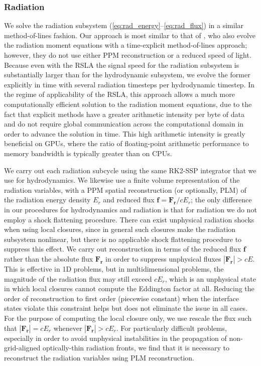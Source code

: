 \documentclass[fleqn,usenatbib]{mnras}
\begin{document}
\subsubsection{Radiation}
\label{sssec:radiation}

We solve the radiation subsystem (\autoref{eq:rad_energy}--\autoref{eq:rad_flux}) in a similar method-of-lines fashion. Our approach is most similar to that of \cite{Skinner_2019}, who also evolve the radiation moment equations with a time-explicit method-of-lines approach; however, they do not use either PPM reconstruction or a reduced speed of light. Because even with the RSLA the signal speed for the radiation subsystem is substantially larger than for the hydrodynamic subsystem, we evolve the former explicitly in time with several radiation timesteps per hydrodynamic timestep. In the regime of applicability of the RSLA, this approach allows a much more computationally efficient solution to the radiation moment equations, due to the fact that explicit methods have a greater arithmetic intensity per byte of data and do not require global communication across the computational domain in order to advance the solution in time. This high arithmetic intensity is greatly beneficial on GPUs, where the ratio of floating-point arithmetic performance to memory bandwidth is typically greater than on CPUs.

We carry out each radiation subcycle using the same RK2-SSP integrator \citep{Shu_1988} that we use for hydrodynamics. We likewise use a finite volume representation of the radiation variables, with a PPM spatial reconstruction (or optionally, PLM) of the radiation energy density $E_r$ and reduced flux $\mathbf{f} = \mathbf{F_r} / cE_r$; the only difference in our procedures for hydrodynamics and radiation is that for radiation we do not employ a shock flattening procedure. There can exist unphysical radiation shocks when using local closures, since in general such closures make the radiation subsystem nonlinear, but there is no applicable shock flattening procedure to suppress this effect. We carry out reconstruction in terms of the reduced flux $\mathbf{f}$ rather than the absolute flux $\mathbf{F_r}$ in order to suppress unphysical fluxes $|\mathbf{F_r}| > cE$. This is effective in 1D problems, but in multidimensional problems, the magnitude of the radiation flux may still exceed $cE_r$, which is an unphysical state in which local closures cannot compute the Eddington factor at all. Reducing the order of reconstruction to first order (piecewise constant) when the interface states violate this constraint helps but does not eliminate the issue in all cases. For the purpose of computing the local closure only, we use rescale the flux such that $|\mathbf{F_r}| = cE_r$ whenever $|\mathbf{F_r}| > cE_r$.  For particularly difficult problems, especially in order to avoid unphysical instabilities in the propagation of non-grid-aligned optically-thin radiation fronts, we find that it is necessary to reconstruct the radiation variables using PLM reconstruction.
\end{document}
